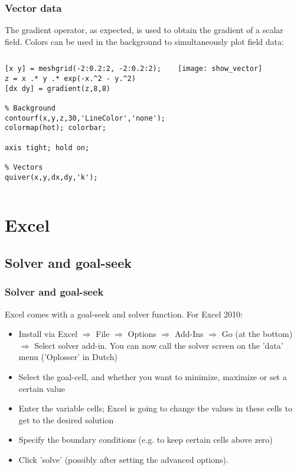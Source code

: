 \documentclass[11pt,table,final,fleqn,xcolor={usenames,dvipsnames}]{beamer}
\begin{document}
\begin{frame}[fragile]
  \frametitle{Vector data}
  The gradient operator, as expected, is used to obtain the gradient of a scalar field. Colors can be used in the background to simultaneously plot field data:
  \begin{columns}[T]
    \begin{lstlisting}
[x y] = meshgrid(-2:0.2:2, -2:0.2:2);
z = x .* y .* exp(-x.^2 - y.^2)
[dx dy] = gradient(z,8,8)

% Background
contourf(x,y,z,30,'LineColor','none');
colormap(hot); colorbar;

axis tight; hold on;

% Vectors
quiver(x,y,dx,dy,'k');

    \end{lstlisting}
   \begin{center}
      \texttt{[image: show\_vector]}
    \end{center}
  \end{columns}
\end{frame}

\section{Excel}
\subsection*{Solver and goal-seek}
\begin{frame}
  \frametitle{Solver and goal-seek}
  Excel comes with a goal-seek and solver function. For Excel 2010:
  \begin{itemize}
    \item Install via Excel $\Rightarrow$ File $\Rightarrow$ Options $\Rightarrow$ Add-Ins $\Rightarrow$ Go (at the bottom) $\Rightarrow$ Select solver add-in. You can now call the solver screen on the 'data' menu ('Oplosser' in Dutch)
    \item Select the goal-cell, and whether you want to minimize, maximize or set a certain value
    \item Enter the variable cells; Excel is going to change the values in these cells to get to the desired solution
    \item Specify the boundary conditions (e.g. to keep certain cells above zero)
    \item Click 'solve' (possibly after setting the advanced options). 
  \end{itemize}
\end{frame}
\end{document}
